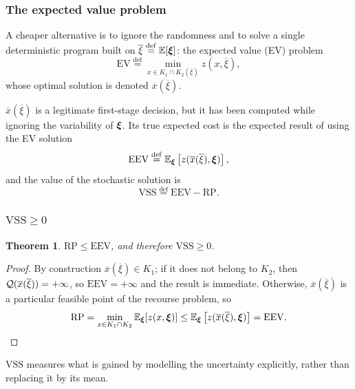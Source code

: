 \documentclass[aspectratio=169]{beamer}
\newtheorem{theo}{Theorem}
\newcommand{\RP}{\mathrm{RP}}
\newcommand{\EV}{\mathrm{EV}}
\newcommand{\EEV}{\mathrm{EEV}}
\newcommand{\VSS}{\mathrm{VSS}}
\begin{document}
\begin{frame}
\frametitle{The expected value problem}

A cheaper alternative is to ignore the randomness and to solve a single deterministic program built on $\overline{\xi} \overset{\mathrm{def}}{=} {\mathbb{E}}[{\boldsymbol{\xi}}]$: the {\red expected value (EV) problem}
\[
\EV \overset{\mathrm{def}}{=} \min_{x \in K_1 \cap K_2(\overline{\xi})} z(x,\overline{\xi}),
\]
whose optimal solution is denoted $\overline{x}(\overline{\xi})$.

\mbox{}

$\overline{x}(\overline{\xi})$ is a legitimate first-stage decision, but it has been computed while ignoring the variability of ${\boldsymbol{\xi}}$.
Its true expected cost is the {\red expected result of using the EV solution}
\[
\EEV \overset{\mathrm{def}}{=} \EE_{\bsxi}\left[ z(\overline{x}(\overline{\xi}),\bsxi) \right],
\]
and the {\red value of the stochastic solution} is
\[
\VSS \overset{\mathrm{def}}{=} \EEV - \RP.
\]

\end{frame}

\begin{frame}
\frametitle{$\VSS \geq 0$}

\begin{theo}
$\RP \leq \EEV$, and therefore $\VSS \geq 0$.
\end{theo}

\begin{proof}
By construction $\overline{x}(\overline{\xi}) \in K_1$; if it does not belong to $K_2$, then ${\mathcal{Q}}(\overline{x}(\overline{\xi})) = +\infty$, so $\EEV = +\infty$ and the result is immediate.
Otherwise, $\overline{x}(\overline{\xi})$ is a particular feasible point of the recourse problem, so
\[
\RP = \min_{x \in K_1 \cap K_2} \EE_{\bsxi}[z(x,\bsxi)] \leq \EE_{\bsxi}\left[z(\overline{x}(\overline{\xi}),\bsxi)\right] = \EEV.
\]
\end{proof}

$\VSS$ measures what is gained by modelling the uncertainty explicitly, rather than replacing it by its mean.

\end{frame}
\end{document}
